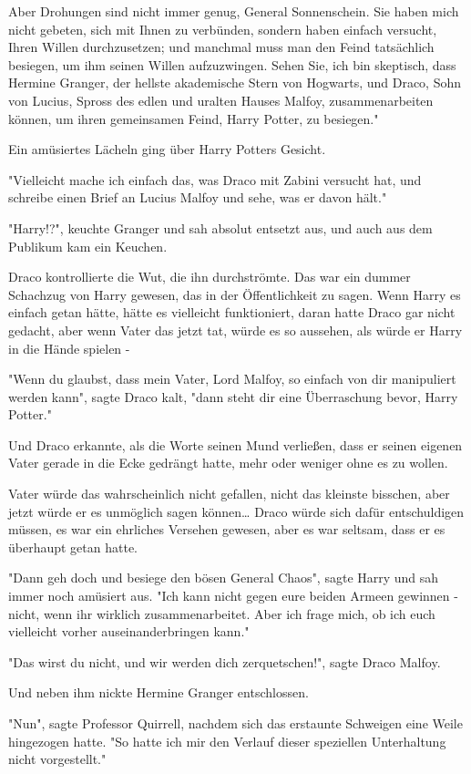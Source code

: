 {Aber Drohungen sind nicht immer genug, General Sonnenschein. Sie haben mich nicht gebeten, sich mit Ihnen zu verbünden, sondern haben einfach versucht, Ihren Willen durchzusetzen; und manchmal muss man den Feind tatsächlich besiegen, um ihm seinen Willen aufzuzwingen. Sehen Sie, ich bin skeptisch, dass Hermine Granger, der hellste akademische Stern von Hogwarts, und Draco, Sohn von Lucius, Spross des edlen und uralten Hauses Malfoy, zusammenarbeiten können, um ihren gemeinsamen Feind, Harry Potter, zu besiegen."

Ein amüsiertes Lächeln ging über Harry Potters Gesicht.

"Vielleicht mache ich einfach das, was Draco mit Zabini versucht hat, und schreibe einen Brief an Lucius Malfoy und sehe, was er davon hält."

"Harry!?", keuchte Granger und sah absolut entsetzt aus, und auch aus dem Publikum kam ein Keuchen.

Draco kontrollierte die Wut, die ihn durchströmte. Das war ein dummer Schachzug von Harry gewesen, das in der Öffentlichkeit zu sagen. Wenn Harry es einfach getan hätte, hätte es vielleicht funktioniert, daran hatte Draco gar nicht gedacht, aber wenn Vater das jetzt tat, würde es so aussehen, als würde er Harry in die Hände spielen -

"Wenn du glaubst, dass mein Vater, Lord Malfoy, so einfach von dir manipuliert werden kann", sagte Draco kalt, "dann steht dir eine Überraschung bevor, Harry Potter."

Und Draco erkannte, als die Worte seinen Mund verließen, dass er seinen eigenen Vater gerade in die Ecke gedrängt hatte, mehr oder weniger ohne es zu wollen.

Vater würde das wahrscheinlich nicht gefallen, nicht das kleinste bisschen, aber jetzt würde er es unmöglich sagen können… Draco würde sich dafür entschuldigen müssen, es war ein ehrliches Versehen gewesen, aber es war seltsam, dass er es überhaupt getan hatte.

"Dann geh doch und besiege den bösen General Chaos", sagte Harry und sah immer noch amüsiert aus. "Ich kann nicht gegen eure beiden Armeen gewinnen - nicht, wenn ihr wirklich zusammenarbeitet. Aber ich frage mich, ob ich euch vielleicht vorher auseinanderbringen kann."

"Das wirst du nicht, und wir werden dich zerquetschen!", sagte Draco Malfoy.

Und neben ihm nickte Hermine Granger entschlossen.

"Nun", sagte Professor Quirrell, nachdem sich das erstaunte Schweigen eine Weile hingezogen hatte. "So hatte ich mir den Verlauf dieser speziellen Unterhaltung nicht vorgestellt."

}
